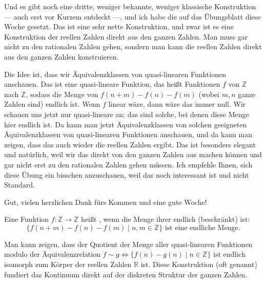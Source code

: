 \begin{spoken-clean}[01:21:10 - 01:21:17]
Und es gibt noch eine dritte, weniger bekannte, weniger klassische Konstruktion --- auch erst vor Kurzem entdeckt ---, und ich habe die auf das Übungsblatt diese Woche gesetzt. Das ist eine sehr nette Konstruktion, und zwar ist es eine Konstruktion der reellen Zahlen direkt aus den ganzen Zahlen. Man muss gar nicht zu den rationalen Zahlen gehen, sondern man kann die reellen Zahlen direkt aus den ganzen Zahlen konstruieren.

Die Idee ist, dass wir Äquivalenzklassen von quasi-linearen Funktionen anschauen. Das ist eine quasi-lineare Funktion, das heißt Funktionen $f$ von $\mathbb{Z}$ nach $\mathbb{Z}$, sodass die Menge von $f(n+m) - f(n) - f(m)$ (wobei $m, n$ ganze Zahlen sind) endlich ist. Wenn $f$ linear wäre, dann wäre das immer null. Wir schauen uns jetzt nur quasi-lineare an; das sind solche, bei denen diese Menge hier endlich ist. Da kann man jetzt Äquivalenzklassen von solchen geeigneten Äquivalenzklassen von quasi-linearen Funktionen anschauen, und da kann man zeigen, dass das auch wieder die reellen Zahlen ergibt. Das ist besonders elegant und natürlich, weil wir das direkt von den ganzen Zahlen aus machen können und gar nicht erst zu den rationalen Zahlen gehen müssen. Ich empfehle Ihnen, sich diese Übung ein bisschen anzuschauen, weil das noch interessant ist und nicht Standard.

Gut, vielen herzlichen Dank fürs Kommen und eine gute Woche!
\end{spoken-clean}

\begin{math-stroke}
\begin{definition}\label{def:quasi-linear}
Eine Funktion $f \colon \mathbb{Z} \to \mathbb{Z}$ heißt , wenn die Menge ihrer  endlich (beschränkt) ist:
\[ \{ f(n+m) - f(n) - f(m) \mid n, m \in \mathbb{Z} \} \text{ ist eine endliche Menge.} \]
\end{definition}

\begin{explanation-of-steps}
Man kann zeigen, dass der Quotient der Menge aller quasi-linearen Funktionen modulo der Äquivalenzrelation $f \sim g \iff \{f(n) - g(n) \mid n \in \mathbb{Z}\} \text{ ist endlich}$ isomorph zum Körper der reellen Zahlen $\mathbb{R}$ ist. Diese Konstruktion (oft  genannt) fundiert das Kontinuum direkt auf der diskreten Struktur der ganzen Zahlen.
\end{explanation-of-steps}
\end{math-stroke}

